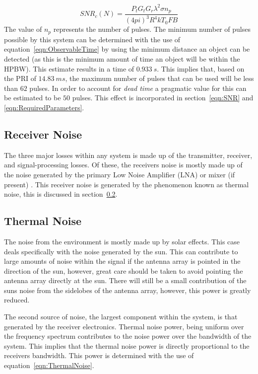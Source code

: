 \documentclass[11pt]{witseiepaper}
\begin{document}
\begin{equation} \label{eqn:MultiplePulses}
SNR_c (N) = \frac{P_{t} G_{t} G_{r} \lambda^2 \sigma n_p}{(4 pi)^3 R^4 k T_0 F B}  
\end{equation}
The value of $n_p$ represents the number of pulses. The minimum number of pulses possible by this system can be determined with the use of equation~\ref{eqn:ObservableTime} by using the minimum distance an object can be detected (as this is the minimum amount of time an object will be within the HPBW). This estimate results in a time of $0.933~s$. This implies that, based on the PRI of $14.83~ms$, the maximum number of pulses that can be used will be less than $62$ pulses.
In order to account for \textit{dead time} a pragmatic value for this can be estimated to be $50$ pulses. This effect is incorporated in section~\ref{eqn:SNR} and \ref{eqn:RequiredParameters}.

\subsection{Receiver Noise} \label{sec:ReceiverNoise}
The three major losses within any system is made up of the transmitter, receiver, and signal-processing losses.
Of these, the receivers noise is mostly made up of the noise generated by the primary Low Noise Amplifier (LNA) or mixer (if present) \cite[p.~405]{radarHandbook}.
This receiver noise is generated by the phenomenon known as thermal noise, this is discussed in section~\ref{sec:ThermalNoise}.

\subsection{Thermal Noise} \label{sec:ThermalNoise}
The noise from the environment is mostly made up by solar effects. This case deals specifically with the noise generated by the sun. This can contribute to large amounts of noise within the signal if the antenna array is pointed in the direction of the sun, however, great care should be taken to avoid pointing the antenna array directly at the sun. There will still be a small contribution of the suns noise from the sidelobes of the antenna array, however, this power is greatly reduced.

The second source of noise, the largest component within the system, is that generated by the receiver electronics.
Thermal noise power, being uniform over the frequency spectrum contributes to the noise power over the bandwidth of the system. This implies that the thermal noise power is directly proportional to the receivers bandwidth. This power is determined with the use of equation~\ref{eqn:ThermalNoise}.
\end{document}

